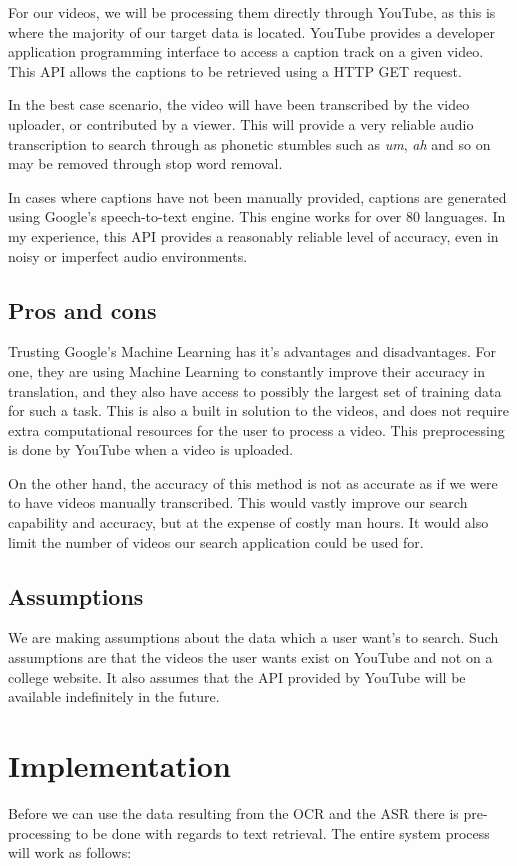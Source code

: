\documentclass[a4paper,12pt]{article}
\begin{document}
For our videos, we will be processing them directly through YouTube, as this is where the majority of our target data is located. YouTube provides a developer application programming interface to access a caption track\cite{asr_cap} on a given video. This API allows the captions to be retrieved using a HTTP GET request.

In the best case scenario, the video will have been transcribed by the video uploader, or contributed by a viewer. This will provide a very reliable audio transcription to search through as phonetic stumbles such as \textit{um}, \textit{ah} and so on may be removed through stop word removal.

In cases where captions have not been manually provided, captions are generated using Google's speech-to-text engine. This engine works for over 80 languages.\cite{asr_speech} In my experience, this API provides a reasonably reliable level of accuracy, even in noisy or imperfect audio environments.

\subsection{Pros and cons}
Trusting Google's Machine Learning has it's advantages and disadvantages. For one, they are using Machine Learning to constantly improve their accuracy in translation, and they also have access to possibly the largest set of training data for such a task. This is also a built in solution to the videos, and does not require extra computational resources for the user to process a video. This preprocessing is done by YouTube when a video is uploaded.

On the other hand, the accuracy of this method is not as accurate as if we were to have videos manually transcribed. This would vastly improve our search capability and accuracy, but at the expense of costly man hours. It would also limit the number of videos our search application could be used for.

\subsection{Assumptions}
We are making assumptions about the data which a user want's to search. Such assumptions are that the videos the user wants exist on YouTube and not on a college website. It also assumes that the API provided by YouTube will be available indefinitely in the future.

\section{Implementation}
Before we can use the data resulting from the OCR and the ASR there is pre-processing to be done with regards to text retrieval. The entire system process will work as follows:
\end{document}
